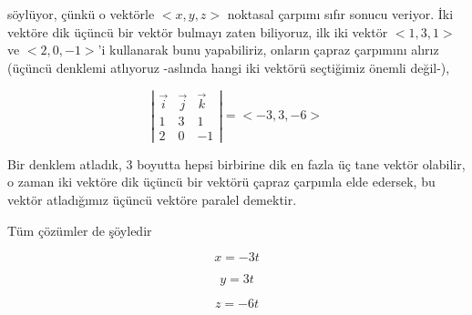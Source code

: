 \documentclass[12pt,fleqn]{article}\usepackage{../../common}
\begin{document}
söylüyor, çünkü o vektörle $<x,y,z >$ noktasal çarpımı sıfır sonucu veriyor. İki
vektöre dik üçüncü bir vektör bulmayı zaten biliyoruz, ilk iki vektör $< 1,3,1
>$ ve $< 2,0,-1 >$'i kullanarak bunu yapabiliriz, onların çapraz çarpımını
alırız (üçüncü denklemi atlıyoruz -aslında hangi iki vektörü seçtiğimiz önemli
değil-),

$$ 
\left|\begin{array}{rrr}
\vec{i} & \vec{j} & \vec{k}  \\
1 & 3 & 1 \\
2 & 0 & -1
\end{array}\right| = < -3,3,-6 >
$$

Bir denklem atladık, 3 boyutta hepsi birbirine dik en fazla üç tane vektör
olabilir, o zaman iki vektöre dik üçüncü bir vektörü çapraz çarpımla elde
edersek, bu vektör atladığımız üçüncü vektöre paralel demektir. 

Tüm çözümler de şöyledir

$$ x = -3t $$

$$ y = 3t $$

$$ z = -6t $$
\end{document}
